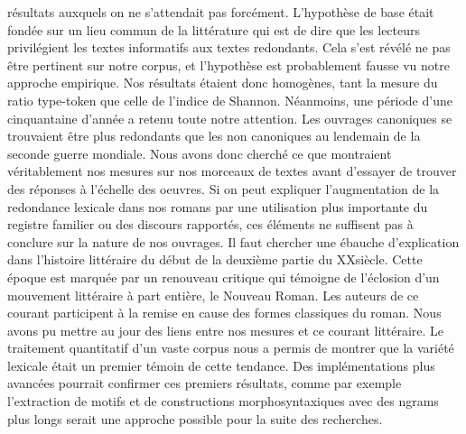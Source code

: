 \documentclass[a4paper,twoside,12pt]{book}
\begin{document}
résultats auxquels on ne s'attendait pas forcément. L'hypothèse de base était fondée sur un lieu commun de la littérature qui est de dire que les lecteurs privilégient les textes informatifs aux textes redondants. Cela s'est révélé ne pas être pertinent sur notre corpus, et l'hypothèse est probablement fausse vu notre approche empirique. Nos résultats étaient donc homogènes, tant la mesure du ratio type-token que celle de l'indice de Shannon. Néanmoins, une période d'une cinquantaine d'année a retenu toute notre attention. Les ouvrages canoniques se trouvaient être plus redondants que les non canoniques au lendemain de la seconde guerre mondiale. Nous avons donc cherché ce que montraient véritablement nos mesures sur nos morceaux de textes avant d'essayer de trouver des réponses à l'échelle des oeuvres. Si on peut expliquer l'augmentation de la redondance lexicale dans nos romans par une utilisation plus importante du registre familier ou des discours rapportés, ces éléments ne suffisent pas à conclure sur la nature de nos ouvrages. Il faut chercher une ébauche d'explication dans l'histoire littéraire du début de la deuxième partie du XX\ieme siècle. Cette époque est marquée par un renouveau critique qui témoigne de l'éclosion d'un mouvement littéraire à part entière, le Nouveau Roman. Les auteurs de ce courant participent à la remise en cause des formes classiques du roman. Nous avons pu mettre au jour des liens entre nos mesures et ce courant littéraire. Le traitement quantitatif d'un vaste corpus nous a permis de montrer que la variété lexicale était un premier témoin de cette tendance. Des implémentations plus avancées pourrait confirmer ces premiers résultats, comme par exemple l'extraction de motifs et de constructions morphosyntaxiques avec des ngrams plus longs serait une approche possible pour la suite des recherches.


\backmatter
\listoffigures

\newpage
\nocite{*}
\printbibliography
\end{document}
